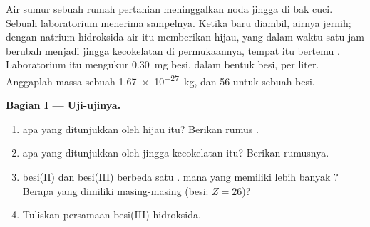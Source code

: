 \begin{problem}
\label{pb:g9:ions:1}
Air sumur sebuah rumah pertanian meninggalkan noda jingga di bak cuci.
Sebuah laboratorium menerima sampelnya. Ketika baru diambil, airnya
jernih; dengan natrium hidroksida air itu memberikan  hijau, yang
dalam waktu satu jam berubah menjadi jingga kecokelatan di permukaannya,
tempat  itu bertemu . Laboratorium itu mengukur
\qty{0.30}{mg} besi, dalam bentuk  besi, per liter. Anggaplah massa
sebuah  \qty{1.67e-27}{kg}, dan 56  untuk sebuah 
besi.

\medskip
\noindent\textbf{Bagian I --- Uji-ujinya.}
\begin{enumerate}
  \item {} apa yang ditunjukkan oleh  hijau itu? Berikan rumus
        .
  \item {} apa yang ditunjukkan oleh  jingga kecokelatan itu?
        Berikan rumusnya.
  \item {} besi(II) dan  besi(III) berbeda satu .  mana
        yang memiliki lebih banyak ? Berapa  yang dimiliki
        masing-masing (besi: $Z = 26$)?
  \item Tuliskan persamaan  besi(III) hidroksida.
\end{enumerate}


\end{problem}
